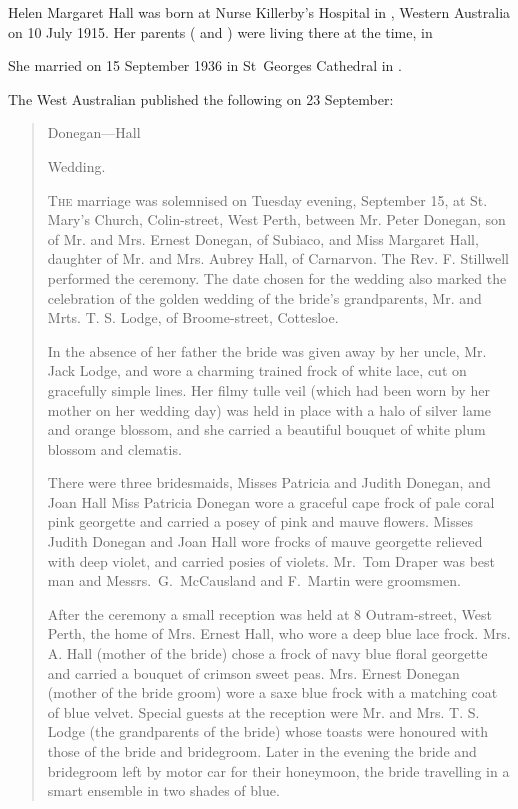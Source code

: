 
Helen Margaret Hall was born at Nurse Killerby's Hospital in , Western Australia\cite{HMHbirthNotice}
on 10 July 1915.\cite{HMHbirth}
Her parents ( and ) were living there at the time,
in

She married  on 15 September 1936 in St~Georges Cathedral in .\cite{MargPeterMarriage}

The West Australian published the following on 23 September:\cite{DoneganHallWedding1936}

\begin{quotation}
Donegan---Hall

Wedding.

\textsc{The} marriage was solemnised on Tuesday evening, September 15, at St. Mary's Church, Colin-street, West Perth,
between Mr. Peter Donegan, son of Mr. and Mrs. Ernest Donegan, of Subiaco, and Miss Margaret Hall, daughter of Mr.
and Mrs. Aubrey Hall, of Carnarvon. The Rev. F. Stillwell performed the ceremony. The date chosen for the wedding
also marked the celebration of the golden wedding of the bride's grandparents, Mr. and Mrts. T. S. Lodge, of
Broome-street, Cottesloe.

In the absence of her father the bride was given away by her uncle, Mr. Jack Lodge, and wore a charming trained frock of
white lace, cut on gracefully simple lines. Her filmy tulle veil (which had been worn by her mother on her wedding day)
was held in place with a halo of silver lame and orange blossom, and she carried a beautiful bouquet of white plum blossom and clematis.

There were three bridesmaids, Misses Patricia and Judith Donegan, and Joan Hall Miss Patricia Donegan wore a graceful cape frock of pale coral pink
georgette and carried a posey of pink and mauve flowers. Misses Judith Donegan and Joan Hall wore frocks of mauve
georgette relieved with deep violet, and carried posies of violets.
Mr.\ Tom Draper was best man and Messrs.\ G.\ McCausland and F.\ Martin were groomsmen.

After the ceremony a small reception was held at 8 Outram-street, West Perth,
the home of Mrs. Ernest Hall, who wore
a deep blue lace frock. Mrs. A. Hall
(mother of the bride) chose a frock of
navy blue floral georgette and carried
a bouquet of crimson sweet peas. Mrs.
Ernest Donegan (mother of the bride groom) wore a saxe blue frock with a matching coat of blue velvet. Special guests at the reception were Mr. and Mrs. T. S. Lodge (the grandparents of the bride) whose toasts were honoured with those of the bride and bridegroom. Later in the evening the bride and bridegroom left by motor car for their honeymoon, the bride travelling in a smart ensemble in two shades of blue.
\end{quotation}

